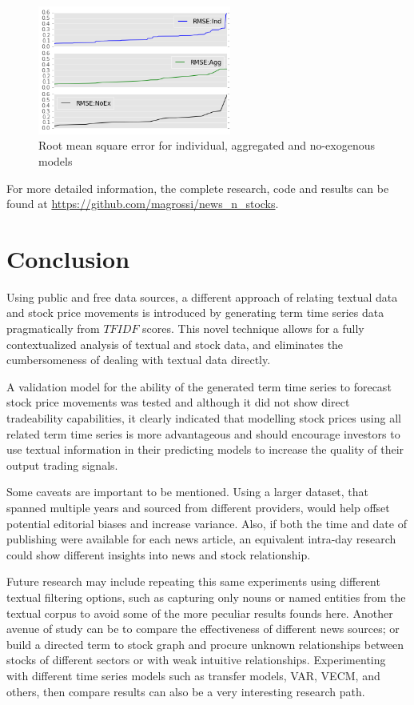 \documentclass[conference,11pt]{IEEEtran}
\begin{document}
\begin{figure}[!htbp]
\centering
\includegraphics[width=2.5in]{rmse_line}
\caption{Root mean square error for individual, aggregated and no-exogenous models}
\label{fig:rmse_line}
\end{figure}

\par
For more detailed information, the complete research, code and results can be found at \url{https://github.com/magrossi/news_n_stocks}.

\section{Conclusion}
Using public and free data sources, a different approach of relating textual data and stock price movements is introduced by generating term time series data pragmatically from \(TFIDF\) scores. This novel technique allows for a fully contextualized analysis of  textual and stock data, and eliminates the cumbersomeness of dealing with textual data directly.

\par
A validation model for the ability of the generated term time series to forecast stock price movements was tested and although it did not show direct tradeability capabilities, it clearly indicated that modelling stock prices using all related term time series is more advantageous and should encourage investors to use textual information in their predicting models to increase the quality of their output trading signals.

\par
Some caveats are important to be mentioned. Using a larger dataset, that spanned multiple years and sourced from different providers, would help offset potential editorial biases and increase variance. Also, if both the time and date of publishing were available for each news article, an equivalent intra-day research could show different insights into news and stock relationship.

\par
Future research may include repeating this same experiments using different textual filtering options, such as capturing only nouns or named entities from the textual corpus to avoid some of the more peculiar results founds here. Another avenue of study can be to compare the effectiveness of different news sources; or build a directed term to stock graph and procure unknown relationships between stocks of different sectors or with weak intuitive relationships. Experimenting with different time series models such as transfer models, VAR, VECM, and others, then compare results can also be a very interesting research path.


\end{document}

